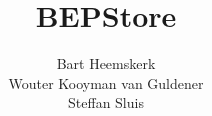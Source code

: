 \documentclass{tudelft-report}
\begin{document}
\frontmatter

\title[Final report\\TI3806 - Bachelorproject]{BEPStore}
\author{Bart Heemskerk\\ Wouter Kooyman van Guldener\\ Steffan Sluis}
\makecover





\tableofcontents

\mainmatter



\appendix

%


\end{document}
